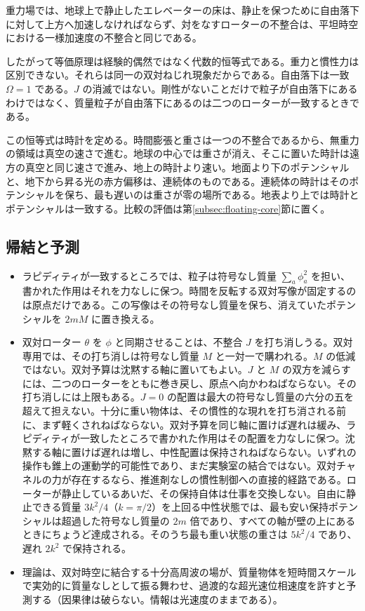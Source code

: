 \documentclass[a4paper]{article}
\begin{document}
重力場では、地球上で静止したエレベーターの床は、静止を保つために自由落下に対して上方へ加速しなければならず、対をなすローターの不整合は、平坦時空における一様加速度の不整合と同じである。

したがって等価原理は経験的偶然ではなく代数的恒等式である。重力と慣性力は区別できない。それらは同一の双対ねじれ現象だからである。自由落下は一致 $\Omega=1$ である。$J$ の消滅ではない。剛性がないことだけで粒子が自由落下にあるわけではなく、質量粒子が自由落下にあるのは二つのローターが一致するときである。

この恒等式は時計を定める。時間膨張と重さは一つの不整合であるから、無重力の領域は真空の速さで進む。地球の中心では重さが消え、そこに置いた時計は遠方の真空と同じ速さで進み、地上の時計より速い。地面より下のポテンシャルと、地下から昇る光の赤方偏移は、連続体のものである。連続体の時計はそのポテンシャルを保ち、最も遅いのは重さが零の場所である。地表より上では時計とポテンシャルは一致する。比較の評価は第\ref{subsec:floating-core}節に置く。

\subsection{帰結と予測}

\begin{itemize}
\item ラピディティが一致するところでは、粒子は符号なし質量 \(\sum_a\phi_a^2\) を担い、書かれた作用はそれを力なしに保つ。時間を反転する双対写像が固定するのは原点だけである。この写像はその符号なし質量を保ち、消えていたポテンシャルを \(2mM\) に置き換える。
\item 双対ローター $\theta$ を $\phi$ と同期させることは、不整合 $J$ を打ち消しうる。双対専用では、その打ち消しは符号なし質量 $M$ と一対一で購われる。$M$ の低減ではない。双対予算は沈黙する軸に置いてもよい。$J$ と $M$ の双方を減らすには、二つのローターをともに巻き戻し、原点へ向かわねばならない。その打ち消しには上限もある。$J=0$ の配置は最大の符号なし質量の六分の五を超えて担えない。十分に重い物体は、その慣性的な現れを打ち消される前に、まず軽くされねばならない。双対予算を同じ軸に置けば遅れは緩み、ラピディティが一致したところで書かれた作用はその配置を力なしに保つ。沈黙する軸に置けば遅れは増し、中性配置は保持されねばならない。いずれの操作も錐上の運動学的可能性であり、まだ実験室の結合ではない。双対チャネルの力が存在するなら、推進剤なしの慣性制御への直接的経路である。ローターが静止しているあいだ、その保持自体は仕事を交換しない。自由に静止できる質量 \(3k^2/4\)（\(k=\pi/2\)）を上回る中性状態では、最も安い保持ポテンシャルは超過した符号なし質量の \(2m\) 倍であり、すべての軸が壁の上にあるときにちょうど達成される。そのうち最も重い状態の重さは \(5k^2/4\) であり、遅れ \(2k^2\) で保持される。
\item 理論は、双対時空に結合する十分高周波の場が、質量物体を短時間スケールで実効的に質量なしとして振る舞わせ、過渡的な超光速位相速度を許すと予測する（因果律は破らない。情報は光速度のままである）。
\end{itemize}
\end{document}
